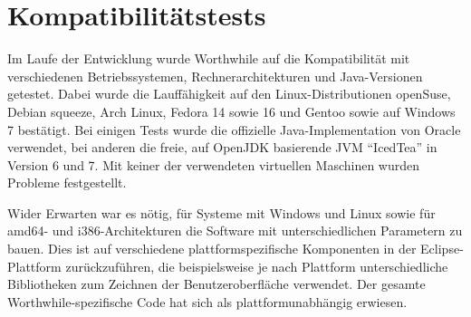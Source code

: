 \section{Kompatibilitätstests}
Im Laufe der Entwicklung wurde Worthwhile auf die Kompatibilität mit verschiedenen Betriebssystemen, Rechnerarchitekturen und Java-Versionen getestet. Dabei wurde die Lauffähigkeit auf den Linux-Distributionen openSuse, Debian squeeze, Arch Linux, Fedora 14 sowie 16 und Gentoo sowie auf Windows 7 bestätigt. Bei einigen Tests wurde die offizielle Java-Implementation von Oracle verwendet, bei anderen die freie, auf OpenJDK basierende JVM ``IcedTea'' in Version 6 und 7. Mit keiner der verwendeten virtuellen Maschinen wurden Probleme festgestellt.

Wider Erwarten war es nötig, für Systeme mit Windows und Linux sowie für amd64- und i386-Architekturen die Software mit unterschiedlichen Parametern zu bauen. Dies ist auf verschiedene plattformspezifische Komponenten in der Eclipse-Plattform zurückzuführen, die beispielsweise je nach Plattform unterschiedliche Bibliotheken zum Zeichnen der Benutzeroberfläche verwendet. Der gesamte Worthwhile-spezifische Code hat sich als plattformunabhängig erwiesen.
